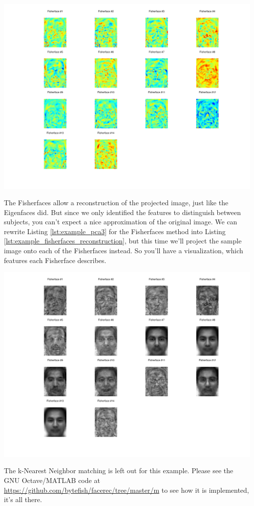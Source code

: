 \begin{center}
	\includegraphics[scale=0.6]{img/fisherfaces/fisherfaces_fisherfaces}
\end{center}

The Fisherfaces allow a reconstruction of the projected image, just like the Eigenfaces did. But since we only identified the features to distinguish between subjects, you can't expect a nice approximation of the original image. We can rewrite Listing \ref{lst:example_pca3} for the Fisherfaces method into Listing \ref{lst:example_fisherfaces_reconstruction}, but this time we'll project the sample image onto each of the Fisherfaces instead. So you'll have a visualization, which features each Fisherface describes.



\begin{center}
	\includegraphics[scale=0.6]{img/fisherfaces/fisherfaces_reconstruction}
\end{center}

The k-Nearest Neighbor matching is left out for this example. Please see the GNU Octave/MATLAB code at \url{https://github.com/bytefish/facerec/tree/master/m} to see how it is implemented, it's all there.
